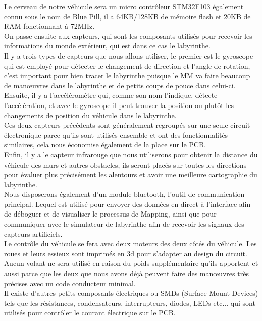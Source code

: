 

	Le cerveau de notre véhicule sera un micro contrôleur STM32F103 également connu 
sous le nom de Blue Pill, il a 64KB/128KB de mémoire flash et 20KB de RAM fonctionnant 
à 72MHz. \\


   On passe ensuite aux capteurs, qui sont les composants utilisés pour recevoir les 
informations du monde extérieur, qui est dans ce cas le labyrinthe. \\


	Il y a trois types de capteurs que nous allons utiliser, le premier est le gyroscope 
qui est employé pour détecter le changement de direction et l'angle de rotation, 
c'est important pour bien tracer le labyrinthe puisque le MM va faire beaucoup de 
manœuvres dans le labyrinthe et de petits coups de pouce dans celui-ci. \\


	Ensuite, il y a l'accéléromètre qui, comme son nom l'indique, détecte l'accélération, 
et avec le gyroscope il peut trouver la position ou plutôt les changements de position 
du véhicule dans le labyrinthe.\\


	Ces deux capteurs précédents sont généralement regroupés sur une seule circuit électronique 
parce qu'ils sont utilisés ensemble et ont des fonctionnalités similaires, cela nous 
économise également de la place sur le PCB. \\


	Enfin, il y a le capteur infrarouge que nous utiliserons pour obtenir la distance 
du véhicule des murs et autres obstacles, ils seront placés sur toutes les directions 
pour évaluer plus précisément les alentours et avoir une meilleure cartographie du 
labyrinthe. \\


	Nous disposerons également d'un module bluetooth, l'outil de communication principal. 
Lequel est utilisé pour envoyer des données en direct à l'interface afin de déboguer 
et de visualiser le processus de Mapping, ainsi que pour communiquer avec le simulateur 
de labyrinthe afin de recevoir les signaux des capteurs artificiels. \\


	Le contrôle du véhicule se fera avec deux moteurs des deux côtés du véhicule. Les 
roues et leurs essieux sont imprimés en 3d pour s'adapter au design du circuit. Aucun 
volant ne sera utilisé en raison du poids supplémentaire qu'ils apportent et aussi 
parce que les deux que nous avons déjà peuvent faire des manœuvres très précises 
avec un code conducteur minimal. \\


   Il existe d'autres petits composants électriques ou SMDs (Surface Mount Devices) 
tels que les résistances, condensateurs, interrupteurs, diodes, LEDs etc... qui sont 
utilisés pour contrôler le courant électrique sur le PCB.
